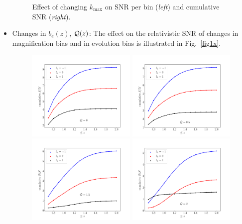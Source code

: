 \begin{itemize}
\begin{figure}[!ht]
\caption{Effect of changing $k_{\mathrm{max}}$ on SNR per bin ({\em left}) and cumulative SNR ({\em right}).} \label{kmsnr}
\end{figure} 
\item  
Changes in $b_e(z)$, $\mathcal{Q}(z)$: 
The effect on the relativistic SNR of changes in magnification bias and in evolution bias is illustrated in Fig.~\ref{fig1x}.
\begin{figure}[!ht]
\centering
\includegraphics[width=0.49\textwidth]{fig/cumulativeSnrdopplerQ0_0-eps-converted-to} 
\includegraphics[width=0.49\textwidth]{fig/cumulativeSnrdopplerQ0_5-eps-converted-to} \\
\includegraphics[width=0.49\textwidth]{fig/cumulativeSnrdopplerQ1_5-eps-converted-to}
\includegraphics[width=0.49\textwidth]{fig/cumulativeSnrdopplerQ2_0-eps-converted-to} 

\end{figure}
\end{itemize}
